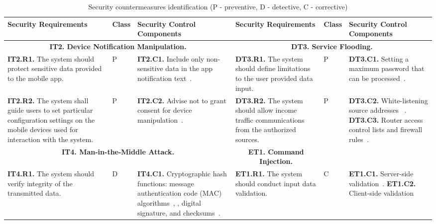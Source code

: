 \documentclass[manuscript]{acmart}
\begin{document}
\begin{table*}[htbp]
\caption{Security countermeasures identification (P - preventive, D - detective, C - corrective)}%
\begin{center}
\begin{tabular}{|p{2.6cm}|p{0.4cm}|p{3.4cm}||p{2.4cm}|p{0.4cm}|p{3.4cm}|}
\hline
\scriptsize\textbf{Security Requirements}&\scriptsize\textbf{Class}&\bf\scriptsize{Security Control Components}&\scriptsize\textbf{Security Requirements}&\scriptsize\textbf{Class}&\bf\scriptsize{Security Control Components} \\
	\hline 
    \multicolumn{3}{|c||}{{\scriptsize{\textbf{IT2. Device Notification Manipulation.}}}}&  \multicolumn{3}{c|}{{\scriptsize{\textbf{DT3. Service Flooding.}}}}\\ \hline
	\scriptsize{\textbf{IT2.R1.} The system should protect sensitive data provided to the mobile app.}& \scriptsize{P} & \scriptsize{\textbf{IT2.C1.} Include only non-sensitive data in the app notification text~\cite{Mitre_ATT_CK}.}& 	\scriptsize{\textbf{DT3.R1.} The system should define limitations to the user provided data input.} & \scriptsize{P} & \scriptsize{\textbf{DT3.C1.} Setting a maximum password that can be processed~\cite{OWASP_webPage}.}\\ \hline
	
	\scriptsize{\textbf{IT2.R2.} The system shall guide users to set particular configuration settings on the mobile devices used for interaction with the system.} & \scriptsize{P} & \scriptsize{\textbf{IT2.C2.} Advise not to grant consent for device  manipulation~\cite{Mitre_ATT_CK}.} & \scriptsize{\textbf{DT3.R2.} The system should allow income traffic communications from the authorized sources.} & \multirow{2}{*}{\scriptsize{P}}& \scriptsize{\textbf{DT3.C2.} White-listening source addresses ~\cite{NistSP800_53}.}  \newline \scriptsize{\textbf{DT3.C3.} Router access control lists and firewall rules~\cite{NistSP800_53}.}\\ \hline
	\multicolumn{3}{|c||}{{\scriptsize{\textbf{IT4. Man-in-the-Middle Attack.}}}} & \multicolumn{3}{c|}{{\scriptsize{\textbf{ET1. Command Injection.}}}}\\ \hline
	
	\scriptsize{\textbf{IT4.R1.} The system should verify integrity of the transmitted data.} & \multirow{2}{*}{\scriptsize{D}} &\scriptsize{ \textbf{IT4.C1.} Cryptographic hash functions: message authentication code (MAC) algorithms~\cite{AVsecurity_AttacksDefTaxonomy_Thing_Wu}, \cite{NistSP800_53}, digital signature, and checksums~\cite{NistSP800_53}.} & \scriptsize{\textbf{ET1.R1.} The system should conduct input data validation.} & \scriptsize{C} & \scriptsize{\textbf{ET1.C1.} Server-side validation~\cite{OWASP_webPage}.} \newline\scriptsize{\textbf{ET1.C2.} Client-side validation~\cite{OWASP_webPage}}\\ \hline


\end{tabular}
\end{center}
\end{table*}
\end{document}
